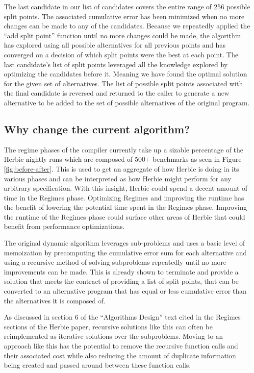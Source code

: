 \documentclass{article}
\begin{document}
The last candidate in our list of candidates covers the entire range of 256 possible split points. The associated cumulative error has been minimized when no more changes can be made to any of the candidates. Because we repeatedly applied the “add split point” function until no more changes could be made, the algorithm has explored using all possible alternatives for all previous points and has converged on a decision of which split points were the best at each point. The last candidate’s list of split points leveraged all the knowledge explored by optimizing the candidates before it. Meaning we have found the optimal solution for the given set of alternatives. The list of possible split points associated with the final candidate is reversed and returned to the caller to generate a new alternative to be added to the set of possible alternatives of the original program.

\subsection{Why change the current algorithm?}


The regime phases of the compiler currently take up a sizable percentage of the Herbie nightly runs which are composed of 500+ benchmarks as seen in Figure \ref{fig:before-after}. This is used to get an aggregate of how Herbie is doing in its various phases and can be interpreted as how Herbie might perform for any arbitrary specification. With this insight, Herbie could spend a decent amount of time in the Regimes phase. Optimizing Regimes and improving the runtime has the benefit of lowering the potential time spent in the Regimes phase. Improving the runtime of the Regimes phase could surface other areas of Herbie that could benefit from performance optimizations.

The original dynamic algorithm leverages sub-problems and uses a basic level of memoization by precomputing the cumulative error sum for each alternative and using a recursive method of solving subproblems repeatedly until no more improvements can be made. This is already shown to terminate and provide a solution that meets the contract of providing a list of split points, that can be converted to an alternative program that has equal or less cumulative error than the alternatives it is composed of.

As discussed in section 6 of the “Algorithms Design” \cite{Algorithm} text cited in the Regimes sections of the Herbie paper, recursive solutions like this can often be reimplemented as iterative solutions over the subproblems. Moving to an approach like this has the potential to remove the recursive function calls and their associated cost while also reducing the amount of duplicate information being created and passed around between these function calls. 
\end{document}
